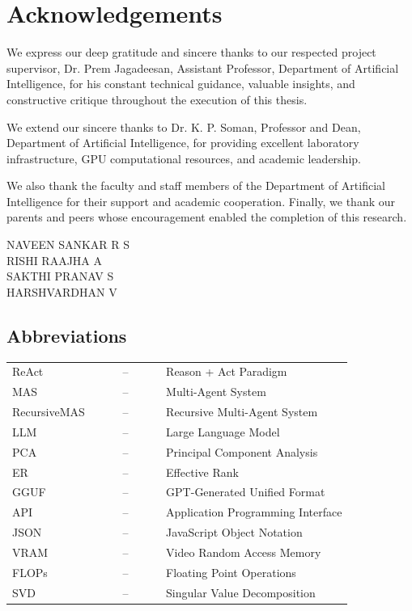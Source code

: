 \documentclass[a4paper, 12pt]{report}
\theoremstyle{definition}
\begin{document}
	\clearpage
	\tableofcontents
	
	\chapter*{Acknowledgements}
	We express our deep gratitude and sincere thanks to our respected project supervisor, Dr. Prem Jagadeesan, Assistant Professor, Department of Artificial Intelligence, for his constant technical guidance, valuable insights, and constructive critique throughout the execution of this thesis.

	We extend our sincere thanks to Dr. K. P. Soman, Professor and Dean, Department of Artificial Intelligence, for providing excellent laboratory infrastructure, GPU computational resources, and academic leadership.

	We also thank the faculty and staff members of the Department of Artificial Intelligence for their support and academic cooperation. Finally, we thank our parents and peers whose encouragement enabled the completion of this research.
	\vspace{1cm}
	\begin{flushright}
		NAVEEN SANKAR R S\\
		RISHI RAAJHA A\\
		SAKTHI PRANAV S\\
		HARSHVARDHAN V
	\end{flushright}

	\listoffigures
	\listoftables

	\newpage
	\section*{{\huge Abbreviations}\hfill}
	\vspace{1.2cm}
	\noindent
	\begin{tabular}{lll}
		ReAct ~~~~&--&~~~~ Reason + Act Paradigm \\
		MAS ~~~~&--&~~~~ Multi-Agent System \\
		RecursiveMAS ~~~~&--&~~~~ Recursive Multi-Agent System \\
		LLM ~~~~&--&~~~~ Large Language Model \\
		PCA ~~~~&--&~~~~ Principal Component Analysis \\
		ER ~~~~&--&~~~~ Effective Rank \\
		GGUF ~~~~&--&~~~~ GPT-Generated Unified Format \\
		API ~~~~&--&~~~~ Application Programming Interface \\
		JSON ~~~~&--&~~~~ JavaScript Object Notation \\
		VRAM ~~~~&--&~~~~ Video Random Access Memory \\
		FLOPs ~~~~&--&~~~~ Floating Point Operations \\
		SVD ~~~~&--&~~~~ Singular Value Decomposition \\
	\end{tabular}
\end{document}
